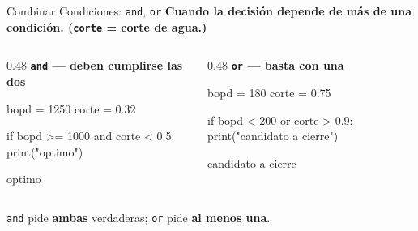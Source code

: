 \documentclass[aspectratio=169, 11pt]{beamer}
\begin{document}
\begin{frame}[fragile,shrink=10]{Combinar Condiciones: \texttt{and}, \texttt{or}}
  \vspace{-4pt}
  {\small\color{arcaDark}\bfseries
    Cuando la decisión depende de \textbf{más de una} condición. (\texttt{corte} = corte de agua.)}

  \vspace{4pt}
  \begin{columns}[T]
    \begin{column}{0.48\textwidth}
      {\scriptsize\color{arcaDark}\bfseries \texttt{and} --- deben cumplirse \textbf{las dos}}
      \begin{pyblock}
bopd = 1250
corte = 0.32

if bopd >= 1000 and corte < 0.5:
    print("optimo")
      \end{pyblock}
      \vspace{2pt}
      \begin{outputblock}
optimo
      \end{outputblock}
    \end{column}

    \begin{column}{0.48\textwidth}
      {\scriptsize\color{arcaDark}\bfseries \texttt{or} --- basta con \textbf{una}}
      \begin{pyblock}
bopd = 180
corte = 0.75

if bopd < 200 or corte > 0.9:
    print("candidato a cierre")
      \end{pyblock}
      \vspace{2pt}
      \begin{outputblock}
candidato a cierre
      \end{outputblock}
    \end{column}
  \end{columns}

  \vspace{3pt}
  {\scriptsize\color{textMuted}
    \faLightbulb[regular]\hspace{3pt}%
    \texttt{and} pide \textbf{ambas} verdaderas; \texttt{or} pide \textbf{al menos una}.}
\end{frame}
\end{document}

